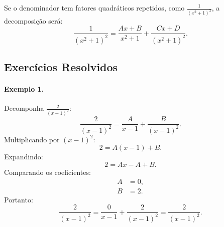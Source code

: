 \documentclass[a4paper,12pt]{article}  %
\begin{document}
Se o denominador tem fatores quadráticos repetidos, como \( \frac{1}{(x^2+1)^2} \), a decomposição será:
\[
\frac{1}{(x^2+1)^2} = \frac{Ax + B}{x^2 + 1} + \frac{Cx + D}{(x^2 + 1)^2}.
\]

\subsection{Exercícios Resolvidos}

\paragraph{Exemplo 1.} Decomponha \( \frac{2}{(x-1)^2} \):
\[
\frac{2}{(x-1)^2} = \frac{A}{x-1} + \frac{B}{(x-1)^2}.
\]
Multiplicando por \( (x-1)^2 \):
\[
2 = A(x-1) + B.
\]
Expandindo:
\[
2 = Ax - A + B.
\]
Comparando os coeficientes:
\begin{align*}
A & = 0, \\
B & = 2.
\end{align*}
Portanto:
\[
\frac{2}{(x-1)^2} = \frac{0}{x-1} + \frac{2}{(x-1)^2} = \frac{2}{(x-1)^2}.
\]
\end{document}
